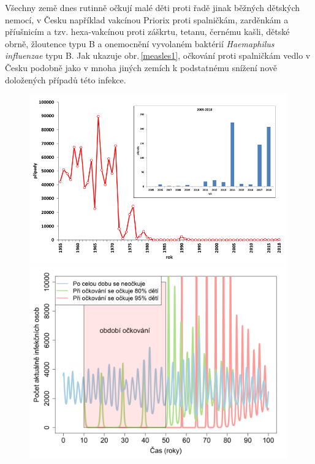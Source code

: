 Všechny země dnes rutinně očkují malé děti proti řadě jinak běžných dětských nemocí, v Česku například vakcínou Priorix proti spalničkám, zarděnkám a příušnicím a tzv. hexa-vakcínou proti záškrtu, tetanu, černému kašli, dětské obrně, žloutence typu B a onemocnění vyvolaném baktérií \emph{Haemaphilus influenzae} typu B. Jak ukazuje obr.\,\ref{measles1}, očkování proti spalničkám vedlo v Česku podobně jako v mnoha jiných zemích k podstatnému snížení nově doložených případů této infekce.

\begin{figure}[h]
	\begin{center}
		\begin{minipage}[m]{0.45\linewidth}
			\includegraphics[width=0.99\textwidth]{pic/measles_data.png}
		\end{minipage}
		\hspace{2ex}
		\begin{minipage}[m]{0.45\linewidth}
			\includegraphics[width=0.99\textwidth]{pic/spalnicky2.png}

\end{minipage}
\end{center}
\end{figure}
